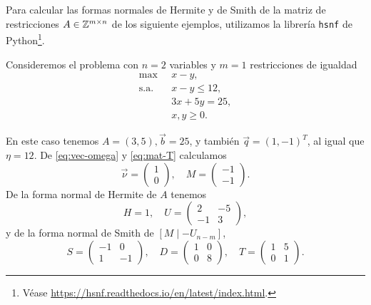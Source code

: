 \newpage
Para calcular las formas normales de Hermite y de Smith de la matriz de restricciones $A \in
\mathbb{Z}^{m \times n}$ de los siguiente ejemplos, utilizamos la librería \texttt{hsnf} de
Python\footnote{
	Véase \url{https://hsnf.readthedocs.io/en/latest/index.html}.
}.
\begin{example}
	\label{ex:two-var}
	Consideremos el problema con $n = 2$ variables y $m = 1$ restricciones de igualdad
	\begin{align*}
		\max
			~& x - y, \\
		\text{s.a.} \quad
			& x - y \leq 12, \\
			& 3x + 5y = 25, \\
			& x, y \geq 0.
	\end{align*}

	En este caso tenemos $A = (3, 5), \vec{b} = 25$, y también $\vec{q} = (1, -1)^T$, al igual que
	$\eta = 12$. De \eqref{eq:vec-omega} y \eqref{eq:mat-T} calculamos
	\begin{equation*}
		\vec{\nu} = \begin{pmatrix} 1 \\ 0 \end{pmatrix},\quad
		M = \begin{pmatrix} -1 \\ -1 \end{pmatrix}.
	\end{equation*}
	De la forma normal de Hermite de $A$ tenemos
	\begin{equation*}
		H = 1,\quad U = \begin{pmatrix} 2 & -5 \\ -1 & 3 \end{pmatrix},
	\end{equation*}
	y de la forma normal de Smith de $[M \mid -U_{n-m}]$,
	\begin{equation*}
		S = \begin{pmatrix} -1 & 0 \\ 1 & -1 \end{pmatrix},\quad
		D = \begin{pmatrix} 1 & 0 \\ 0 & 8 \end{pmatrix},\quad
		T = \begin{pmatrix} 1 & 5 \\ 0 & 1 \end{pmatrix}. 
	\end{equation*}


\end{example}

